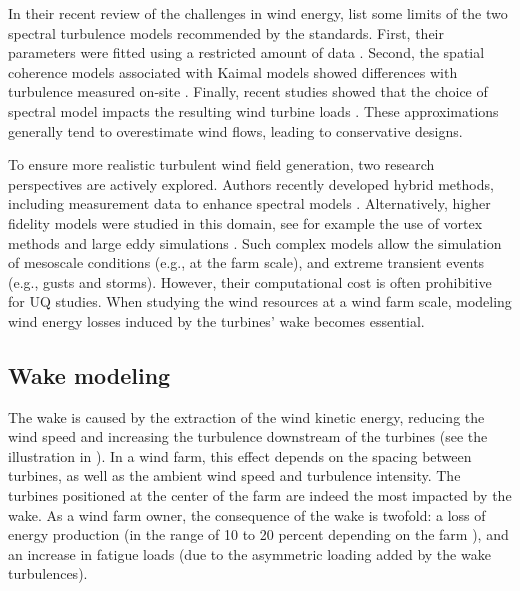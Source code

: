 In their recent review of the challenges in wind energy, \citet{veers_2019_review} list some limits of the two spectral turbulence models recommended by the standards. 
First, their parameters were fitted using a restricted amount of data \citep{dimitrov_2017_turbulence_models_on_loads}. 
Second, the spatial coherence models associated with Kaimal models showed differences with turbulence measured on-site \citep{saranyasoontorn_2004}.  
Finally, recent studies showed that the choice of spectral model impacts the resulting wind turbine loads \citep{doubrawa_2019}. 
These approximations generally tend to overestimate wind flows, leading to conservative designs. 

To ensure more realistic turbulent wind field generation, two research perspectives are actively explored. 
Authors recently developed hybrid methods, including measurement data to enhance spectral models \citep{dimitrov_2017_constrained_turbulence}. 
Alternatively, higher fidelity models were studied in this domain, see for example the use of vortex methods \citep{branlard_2017_book} and large eddy simulations \citep{doubrawa_2019,bui_2022_mesoscale_LES}.  
Such complex models allow the simulation of mesoscale conditions (e.g., at the farm scale), and extreme transient events (e.g., gusts and storms). 
However, their computational cost is often prohibitive for UQ studies. 
When studying the wind resources at a wind farm scale, modeling wind energy losses induced by the turbines' wake becomes essential. 



\subsection{Wake modeling}\label{sec:222}

The wake is caused by the extraction of the wind kinetic energy, reducing the wind speed and increasing the turbulence downstream of the turbines (see the illustration in ). 
In a wind farm, this effect depends on the spacing between turbines, as well as the ambient wind speed and turbulence intensity. 
The turbines positioned at the center of the farm are indeed the most impacted by the wake. 
As a wind farm owner, the consequence of the wake is twofold: a loss of energy production (in the range of 10 to 20 percent depending on the farm \citealp[Chapt. 9]{burton_2021_wind_handbook}), and an increase in fatigue loads (due to the asymmetric loading added by the wake turbulences).

